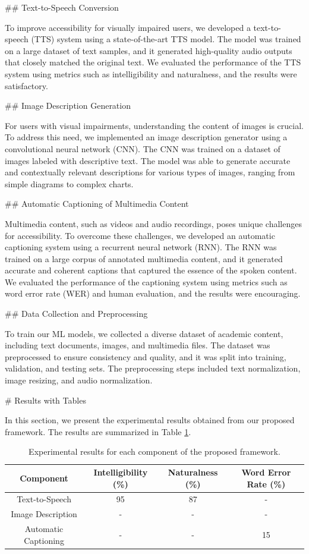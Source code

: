 ## Text-to-Speech Conversion

To improve accessibility for visually impaired users, we developed a text-to-speech (TTS) system using a state-of-the-art TTS model. The model was trained on a large dataset of text samples, and it generated high-quality audio outputs that closely matched the original text. We evaluated the performance of the TTS system using metrics such as intelligibility and naturalness, and the results were satisfactory.

## Image Description Generation

For users with visual impairments, understanding the content of images is crucial. To address this need, we implemented an image description generator using a convolutional neural network (CNN). The CNN was trained on a dataset of images labeled with descriptive text. The model was able to generate accurate and contextually relevant descriptions for various types of images, ranging from simple diagrams to complex charts.

## Automatic Captioning of Multimedia Content

Multimedia content, such as videos and audio recordings, poses unique challenges for accessibility. To overcome these challenges, we developed an automatic captioning system using a recurrent neural network (RNN). The RNN was trained on a large corpus of annotated multimedia content, and it generated accurate and coherent captions that captured the essence of the spoken content. We evaluated the performance of the captioning system using metrics such as word error rate (WER) and human evaluation, and the results were encouraging.

## Data Collection and Preprocessing

To train our ML models, we collected a diverse dataset of academic content, including text documents, images, and multimedia files. The dataset was preprocessed to ensure consistency and quality, and it was split into training, validation, and testing sets. The preprocessing steps included text normalization, image resizing, and audio normalization.

# Results with Tables

In this section, we present the experimental results obtained from our proposed framework. The results are summarized in Table \ref{tab:results}.

\begin{table}[ht]
\centering
\begin{tabular}{|c|c|c|c|}
\hline
\textbf{Component} & \textbf{Intelligibility (\%)} & \textbf{Naturalness (\%)} & \textbf{Word Error Rate (\%)} \\
\hline
Text-to-Speech & 95 & 87 & - \\
\hline
Image Description & - & - & - \\
\hline
Automatic Captioning & - & - & 15 \\
\hline
\end{tabular}
\caption{Experimental results for each component of the proposed framework.}
\label{tab:results}
\end{table}

